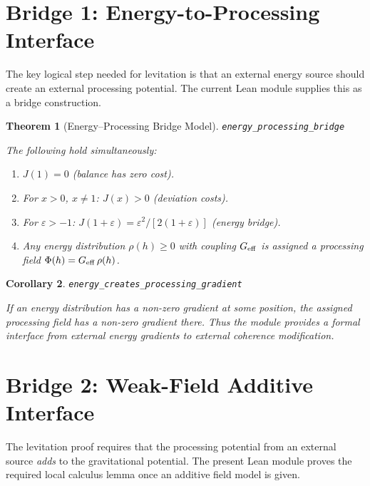 \documentclass[11pt,a4paper]{article}
\newtheorem{theorem}{Theorem}[section]
\newtheorem{corollary}[theorem]{Corollary}
\newcommand{\Jcost}{J}
\newcommand{\lean}[1]{\texttt{\small #1}}
\begin{document}
\section{Bridge 1: Energy-to-Processing Interface}
\label{sec:gap1}

The key logical step needed for levitation is that an external energy source should create an external processing potential.
The current Lean module supplies this as a bridge construction.

\begin{theorem}[Energy--Processing Bridge Model]
\label{thm:gap1}
\lean{energy\_processing\_bridge}

The following hold simultaneously:
\begin{enumerate}[label=(\roman*)]
    \item $\Jcost(1) = 0$ (balance has zero cost).
    \item For $x > 0$, $x \neq 1$: $\Jcost(x) > 0$ (deviation costs).
    \item For $\varepsilon > -1$: $\Jcost(1+\varepsilon) = \varepsilon^2/[2(1+\varepsilon)]$ (energy bridge).
    \item Any energy distribution $\rho(h) \geq 0$ with coupling $G_{\rm eff}$ is assigned a processing field $\Phi(h) = G_{\rm eff}\,\rho(h)$.
\end{enumerate}
\end{theorem}

\begin{corollary}
\lean{energy\_creates\_processing\_gradient}

If an energy distribution has a non-zero gradient at some position, the assigned processing field has a non-zero gradient there.
Thus the module provides a formal interface from external energy gradients to external coherence modification.
\end{corollary}

\section{Bridge 2: Weak-Field Additive Interface}
\label{sec:gap2}

The levitation proof requires that the processing potential from an external source \emph{adds} to the gravitational potential.
The present Lean module proves the required local calculus lemma once an additive field model is given.
\end{document}
